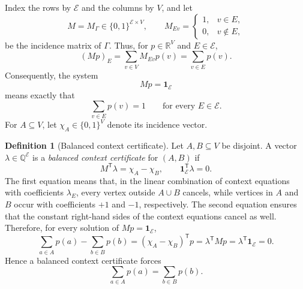 \documentclass[
  twocolumn,
  aps,
  pra,
  floatfix,
  amsmath,amssymb,
  longbibliography
]{revtex4-2}
\theoremstyle{definition}
\newtheorem{definition}[theorem]{Definition}
\theoremstyle{remark}
\newcommand{\E}{\mathcal E}
\newcommand{\one}{\mathbf 1}
\begin{document}
Index the rows by $\E$ and the columns by $V$, and let
\begin{equation}
 M=M_\Gamma\in\{0,1\}^{\E\times V},\qquad
 M_{Ev}=
 \begin{cases}
  1,&v\in E,\\
  0,&v\notin E,
 \end{cases}
 \label{eq:incidence}
\end{equation}
be the incidence matrix of $\Gamma$.  Thus, for
$p\in\mathbb R^V$ and $E\in\E$,
\[
 (Mp)_E
 =\sum_{v\in V}M_{Ev}p(v)
 =\sum_{v\in E}p(v).
\]
Consequently, the system
\begin{equation}
  Mp=\one_\E
  \label{eq:matrix-normalization}
\end{equation}
means exactly that
\[
 \sum_{v\in E}p(v)=1
 \qquad\text{for every }E\in\E.
\]
For $A\subseteq V$, let $\chi_A\in\{0,1\}^{V}$ denote its incidence vector.
\begin{definition}[Balanced context certificate]
Let $A,B\subseteq V$ be disjoint.  A vector
$\lambda\in\mathbb Q^{\E}$ is a \emph{balanced context certificate} for
$(A,B)$ if
\begin{equation}
 M^{\mathsf T}\lambda=\chi_A-\chi_B,
 \qquad
 \one_\E^{\mathsf T}\lambda=0.
 \label{eq:certificate}
\end{equation}
The first equation means that, in the linear combination of context
equations with coefficients $\lambda_E$, every vertex outside
$A\cup B$ cancels, while vertices in $A$ and $B$ occur with coefficients
$+1$ and $-1$, respectively.  The second equation ensures that the
constant right-hand sides of the context equations cancel as well.
Therefore, for every solution of $Mp=\one_\E$,
\[
 \sum_{a\in A}p(a)-\sum_{b\in B}p(b)
 = (\chi_A-\chi_B)^{\mathsf T}p
 = \lambda^{\mathsf T}Mp
 = \lambda^{\mathsf T}\one_\E
 = 0.
\]
Hence a balanced context certificate forces
\[
 \sum_{a\in A}p(a)=\sum_{b\in B}p(b).
\]
\end{definition}
\end{document}
